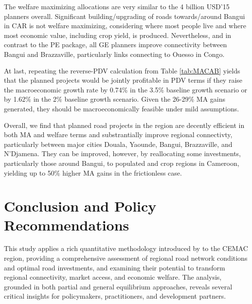 \documentclass[a4paper]{article}
\begin{document}
The welfare maximizing allocations are very similar to the 4 billion USD'15 planners overall. Significant building/upgrading of roads towards/around Bangui in CAR is not welfare maximizing, considering where most people live and where most economic value, including crop yield, is produced. Nevertheless, and in contrast to the PE package, all GE planners improve connectivity between Bangui and Brazzaville, particularly links connecting to Ouesso in Congo. \newline 


At last, repeating the reverse-PDV calculation from Table \ref{tab:MACAB} yields that the planned projects would be jointly profitable in PDV terms if they raise the macroeconomic growth rate by 0.74\% in the 3.5\% baseline growth scenario or by 1.62\% in the 2\% baseline growth scenario. Given the 26-29\% MA gains generated, they should be macroeconomically feasible under mild assumptions. \newline 

Overall, we find that planned road projects in the region are decently efficient in both MA and welfare terms and substrantially improve regional connectivty, particularly between major cities Douala, Yaounde, Bangui, Brazzaville, and N'Djamena. They can be improved, however, by reallocating some investments, particularly those around Bangui, to populated and crop regions in Cameroon, yielding up to 50\% higher MA gains in the frictionless case. \newline 

\section{Conclusion and Policy Recommendations} 


This study applies a rich quantitative methodology introduced by \citet{krantz2024optimal} to the CEMAC region, providing a comprehensive assessment of regional road network conditions and optimal road investments, and examining their potential to transform regional connectivity, market access, and economic welfare. The analysis, grounded in both partial and general equilibrium approaches, reveals several critical insights for policymakers, practitioners, and development partners.  \newline

\end{document}
